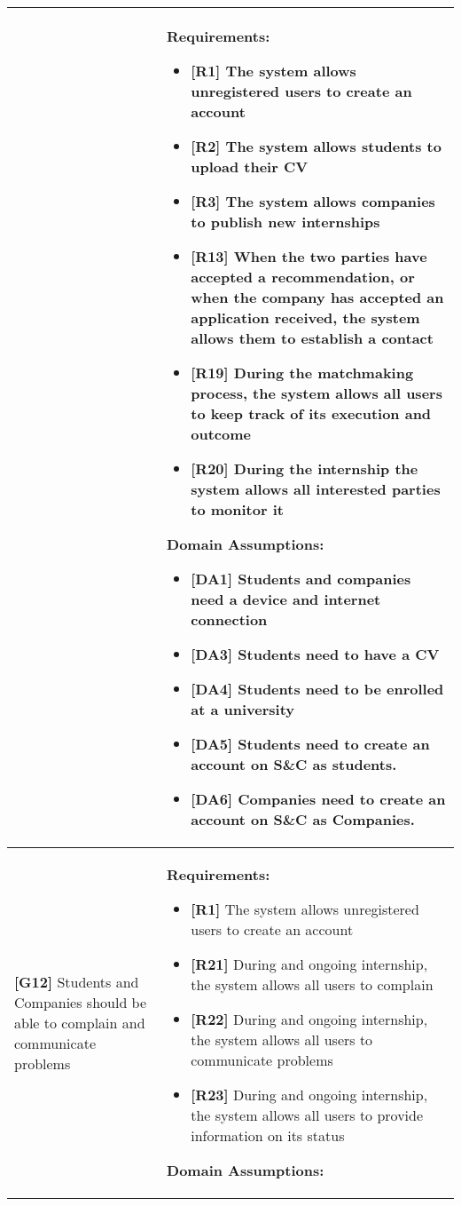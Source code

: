 \begin{longtable}{|p{}|p{}|}
& 
\textbf{Requirements:}
\begin{itemize}
    \item \textbf{[R1]} The system allows unregistered users to create an account
    \item \textbf{[R2]} The system allows students to upload their CV
    \item \textbf{[R3]} The system allows companies to publish new internships
    \item \textbf{[R13]} When the two parties have accepted a recommendation, or when the company has accepted an application received, the system allows them to establish a contact
    \item \textbf{[R19]} During the matchmaking process, the system allows all users to keep track of its execution and outcome
    \item \textbf{[R20]} During the internship the system allows all interested parties to monitor it
\end{itemize}
\textbf{Domain Assumptions:}
\begin{itemize}
     \item \textbf{[DA1]} Students and companies need a device and internet connection
     \item \textbf{[DA3]} Students need to have a CV
     \item \textbf{[DA4]} Students need to be enrolled at a university
    \item \textbf{[DA5]} Students need to create an account on S\&C as students.
    \item \textbf{[DA6]} Companies need to create an account on S\&C as Companies.
\end{itemize} \\
\hline
\textbf{[G12]} Students and Companies should be able to complain and communicate problems
& 
\textbf{Requirements:}
\begin{itemize}
    \item \textbf{[R1]} The system allows unregistered users to create an account
    \item \textbf{[R21]} During and ongoing internship, the system allows all users to complain
    \item \textbf{[R22]} During and ongoing internship, the system allows all users to communicate problems
    \item \textbf{[R23]} During and ongoing internship, the system allows all users to provide information on its status
\end{itemize}
\textbf{Domain Assumptions:}

\end{longtable}
